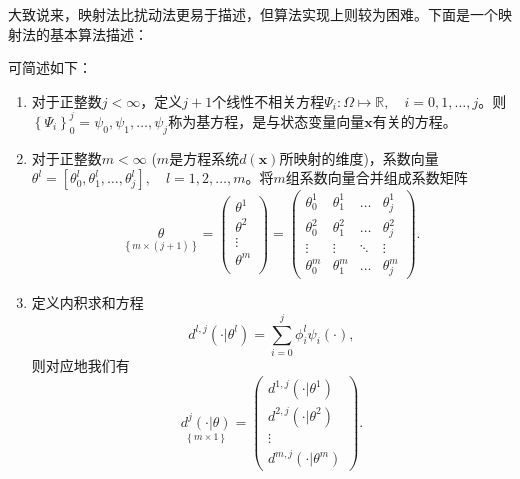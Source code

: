 大致说来，映射法比扰动法更易于描述，但算法实现上则较为困难。下面是一个映射法的基本算法描述：
\begin{algorithm}[映射法的基本算法] 可简述如下：
  \begin{enumerate}
    \item 对于正整数$j < \infty$，定义$j+1$个线性不相关方程$\Psi_i:\Omega \mapsto \mathbb{R}, \quad i=0,1,\ldots,j$。则$\left\{\Psi_{i}\right\}_{0}^{j} = \psi_0, \psi_1, \ldots, \psi_j$称为基方程，是与状态变量向量$\bm{x}$有关的方程。

    \item 对于正整数$m < \infty$ ($m$是方程系统$d(\bm{x})$所映射的维度)，系数向量$\theta^{l} = \left[  \theta_0^{l}, \theta_1^{l}, \ldots, \theta_j^{l} \right], \quad l = 1,2,\ldots,m$。将$m$组系数向量合并组成系数矩阵
    \begin{equation*}
      \underset{ \left\{ m \times (j+1) \right\}}{\theta} = \begin{pmatrix}
      \theta^1 \\
      \theta^2 \\
      \vdots \\
      \theta^m \\
    \end{pmatrix}
    = \begin{pmatrix}
    \theta_0^{1}& \theta_1^{1}& \ldots & \theta_j^{1}  \\
    \theta_0^{2}& \theta_1^{2}& \ldots & \theta_j^{2}  \\
    \vdots & \vdots & \ddots & \vdots\\
    \theta_0^{m}& \theta_1^{m}& \ldots & \theta_j^{m}
    \end{pmatrix}.
    \end{equation*}
    \item 定义内积求和方程
    \begin{equation*}
      d^{l,j}(\cdot | \theta^{l}) = \sum_{i=0}^{j} \phi_{i}^{l} \psi_i(\cdot),
    \end{equation*}
    则对应地我们有
    \begin{equation*}
      \underset{ \left\{ m \times 1 \right\} } {d^{j}(\cdot | \theta)}
      = \begin{pmatrix}
      d^{1, j}(\cdot | \theta^{1})\\
      d^{2, j}(\cdot | \theta^{2})\\
      \vdots \\
      d^{m, j}(\cdot | \theta^{m})
      \end{pmatrix}.
    \end{equation*}

\end{enumerate}
\end{algorithm}
